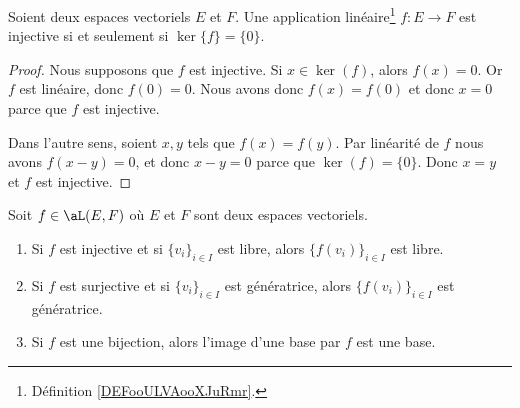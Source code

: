 \begin{proposition}
    Soient deux espaces vectoriels \( E\) et \( F\). Une application linéaire\footnote{Définition \ref{DEFooULVAooXJuRmr}.} \( f\colon E\to F\) est injective si et seulement si \( \ker\{ f \}=\{ 0 \}\).
\end{proposition}

\begin{proof}
    Nous supposons que \( f\) est injective. Si \( x\in\ker(f)\), alors \( f(x)=0\). Or \( f\) est linéaire, donc \( f(0)=0\). Nous avons donc \( f(x)=f(0)\) et donc \( x=0\) parce que \( f\) est injective.

    Dans l'autre sens, soient \( x,y\) tels que \( f(x)=f(y)\). Par linéarité de \( f\) nous avons \( f(x-y)=0\), et donc \( x-y=0\) parce que \( \ker(f)=\{0\}\). Donc \( x=y\) et \( f\) est injective.
\end{proof}

\begin{proposition}      \label{PROPooZFKZooBGLSex}
    Soit \( f\in \aL(E,F)\) où \( E\) et \( F\) sont deux espaces vectoriels.
    \begin{enumerate}
        \item   \label{ITEMooPPMEooIaZqtm}
            Si \( f\) est injective et si \( \{v_i\}_{i\in I}\) est libre, alors \( \{f(v_i)\}_{i\in I}\) est libre.
        \item   \label{ITEMooOZSPooQBrDGi}
            Si \( f\) est surjective et si \( \{v_i\}_{i\in I}\) est génératrice, alors \( \{f(v_i)\}_{i\in I}\) est génératrice.
        \item   \label{ITEMooOIEYooIfdFnv}
            Si \( f\) est une bijection, alors l'image d'une base par \( f\) est une base.
    \end{enumerate}
\end{proposition}

